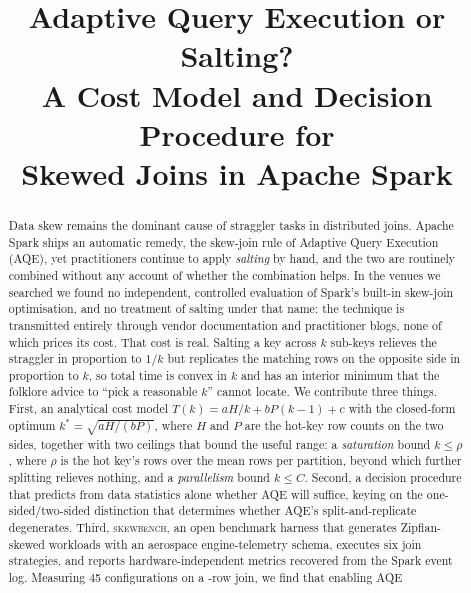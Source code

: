 \documentclass[conference]{IEEEtran}
\begin{document}
\title{Adaptive Query Execution or Salting?\\
A Cost Model and Decision Procedure for\\
Skewed Joins in Apache Spark}

\author{
}

\maketitle

\begin{abstract}
Data skew remains the dominant cause of straggler tasks in distributed joins.
Apache Spark ships an automatic remedy, the skew-join rule of Adaptive Query
Execution (AQE), yet practitioners continue to apply \emph{salting} by hand,
and the two are routinely combined without any account of whether the
combination helps. In the venues we searched we found no
independent, controlled evaluation of Spark's built-in skew-join optimisation,
and no treatment of salting under that name: the technique is transmitted entirely
through vendor documentation and practitioner blogs, none of which prices its
cost. That cost is real. Salting a key across $k$ sub-keys relieves the
straggler in proportion to $1/k$ but replicates the matching rows on the
opposite side in proportion to $k$, so total time is convex in $k$ and has an
interior minimum that the folklore advice to ``pick a reasonable $k$'' cannot
locate.
We contribute three things. First, an analytical cost model
$T(k)=aH/k+bP(k-1)+c$ with the closed-form optimum $k^{*}=\sqrt{aH/(bP)}$,
where $H$ and $P$ are the hot-key row counts on the two sides, together with
two ceilings that bound the useful range: a \emph{saturation} bound
$k\le\rho$, where $\rho$ is the hot key's rows over the mean rows per
partition, beyond which further splitting relieves nothing, and a
\emph{parallelism} bound $k\le C$. Second, a decision procedure that predicts
from data statistics alone whether AQE will suffice, keying on the
one-sided/two-sided distinction that determines whether AQE's
split-and-replicate degenerates. Third, \textsc{skewbench}, an open
benchmark harness that generates Zipfian-skewed workloads with an
aerospace engine-telemetry schema, executes six join strategies, and reports
hardware-independent metrics recovered from the Spark event log.
Measuring 45 configurations on a \NFACT-row join, we find that enabling AQE

\end{abstract}
\end{document}
